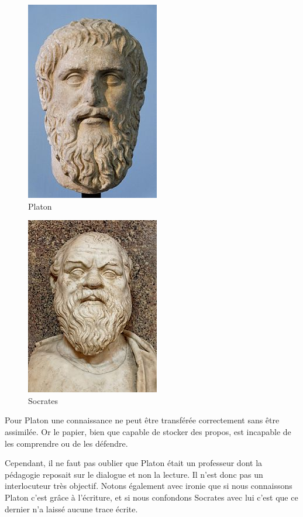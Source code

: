\begin{minipage}[H]{0.49\linewidth}
  \begin{figure}[H]
  \centering
  \includegraphics[height=0.15\paperheight]{../resources/illustrations/plato2}
  \caption{Platon}
  \end{figure}
\end{minipage}
\begin{minipage}[H]{0.49\linewidth}
  \begin{figure}[H]
  \centering
  \includegraphics[height=0.15\paperheight]{../resources/illustrations/socrates}
  \caption{Socrates}
  \end{figure}
\end{minipage}

Pour Platon une connaissance ne peut être transférée correctement sans être assimilée. Or le papier, bien que capable de stocker des propos, est incapable de les comprendre ou de les défendre.

Cependant, il ne faut pas oublier que Platon était un professeur dont la pédagogie reposait sur le dialogue et non la lecture. Il n'est donc pas un interlocuteur très objectif. Notons également avec ironie que si nous connaissons Platon c'est grâce à l'écriture, et si nous confondons Socrates avec lui c'est que ce dernier n'a laissé aucune trace écrite.

